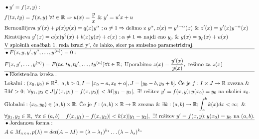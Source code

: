 \documentclass[a4paper, 8pt]{article}
\title{\vspace{-8.5 cm}}
\newcommand{\abs}[1]{\ensuremath{\lvert #1 \rvert}}
\newcommand{\mth}[1]{\ensuremath{\mathbb{#1}}}
\newcommand{\R}{\mth{R}}
\newcommand{\map}[3]{\ensuremath{{#1}: {#2} \rightarrow {#3}}}
\begin{document}
	\pagestyle{empty}
	\maketitle
	\begin{align*}
		&\bullet y' = f(x, y):\\
		&f(tx, ty)=f(x, y)~\forall t\in\R \Rightarrow u(x) = \frac{y}{x} ~\&~ y' = u'x + u\\
		&\text{Bernoullijeva}~ y'(x) + p(x)y(x) = q(x)y^{\alpha}~;\alpha \neq 1 \Rightarrow \text{delimo z}~y^{\alpha}, z(x)=y^{1-\alpha}(x) ~\&~ z'(x)=y'(x)y^{-\alpha}(x)\\
		&\text{Ricattijeva}~ y'(x)=a(x)y^2(x) + b(x)y(x) + c(x)~;\alpha \neq 1 \Rightarrow \text{najdi eno}~y_p ~\&~ y(x)=y_p(x) + u(x)\\
		&\text{V splošnih enačbah $1.$ reda izrazi y', če lahko, sicer pa smiselno parametriziraj}. \\ \hline
		&\bullet F(x, y, y', y'', \ldots, y^{(n)}) = 0: \\
		& F(x, y', \ldots, y^{(n)}) = F(tx, ty, ty', \ldots, ty^{(n)}) \forall t\in\R;~\text{Uporabimo}~z(x) = \frac{y'(x)}{y(x)},~\text{rešimo za}~z(x) \\ \hline
		& \bullet\text{Eksistenčna izreka}: \\
		& \text{Lokalni}:(x_0, y_0)\in\R^2,~a, b>0, I= [x_0 - a, x_0 + a], J= [y_0 - b, y_0 + b].~\text{Če je}~\map{f}{I\times J}{\R}~\text{zvezna}~\& \\
		&\exists M>0;~\forall y_1, y_2\in J \abs{f(x, y_1) - f(x, y_2)}< M\abs{y_1 - y_2},~\exists!~\text{rešitev}~ y'=f(x, y); y(x_0) = y_0~\text{na okolici}~x_0. \\
		& \text{Globalni}:(x_0, y_0)\in(a, b)\times\R.~\text{Če je}~\map{f}{(a, b)\times\R}{\R}~\text{zvezna}~\&~\exists \map{k}{(a, b)}{\R};\int_{a}^{b} k(x)dx < \infty;~\&~ \\
		&\forall y_1, y_2\in \R,~\forall x\in(a, b):\abs{f(x, y_1) - f(x, y_2)}< k(x)\abs{y_1 - y_2},~\exists!~\text{rešitev}~ y'=f(x, y); y(x_0) = y_0~\text{na}~(a, b). \\ \hline
		& \bullet\text{Jordanova forma}: \\
		& A \in M_{n\times n}, p(\lambda) = det(A - \lambda I)= (\lambda - \lambda_1)^{k_1}\ldots(\lambda - \lambda_s)^{k_s} \\

\end{align*}
\end{document}
